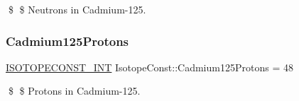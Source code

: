 \$ \$ Neutrons in Cadmium-\/125. \mbox{\label{group___isotope_const-_cadmium-_cd125_ga67e45c5a64f5fc7d1597d3cdce96aa82}} 
\subsubsection{\texorpdfstring{Cadmium125\+Protons}{Cadmium125Protons}}
{\footnotesize\ttfamily \mbox{\hyperlink{group___isotope_const-_macros_ga5f18360b3e99483a35c32d789e62621c}{I\+S\+O\+T\+O\+P\+E\+C\+O\+N\+S\+T\+\_\+\+I\+NT}} Isotope\+Const\+::\+Cadmium125\+Protons = 48}

\$ \$ Protons in Cadmium-\/125. 